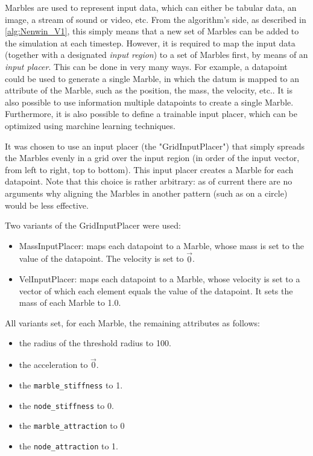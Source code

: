 Marbles are used to represent input data, which can either be tabular data, an image, a stream of sound or video, etc.
From the algorithm's side, as described in \ref{alg:Nenwin_V1}, 
this simply means that a new set of Marbles can be added to the simulation at each timestep.
However, it is required to map the input data (together with a designated \textit{input region}) to a set of Marbles first, by means of an \textit{input placer}.
This can be done in very many ways. For example, a datapoint could be used to generate a single Marble, in which the datum is mapped to an attribute of the Marble, such as the position, the mass, the velocity, etc.. It is also possible to use information multiple datapoints to create a single Marble. Furthermore, it is also possible to define a trainable input placer, which can be optimized using marchine learning techniques.

It was chosen to use an input placer (the "GridInputPlacer") that simply spreads the Marbles evenly in a grid over the input region (in order of the input vector, from left to right, top to bottom). This input placer creates a Marble for each datapoint.
Note that this choice is rather arbitrary: as of current there are no arguments why aligning the Marbles in another pattern (such as on a circle) would be less effective.

Two variants of the GridInputPlacer were used:
\begin{itemize}
	\item MassInputPlacer: maps each datapoint to a Marble, whose mass is set to the value of the datapoint. The velocity is set to $\vec{0}$.
	\item VelInputPlacer: maps each datapoint to a Marble, whose velocity is set to a vector of which each element equals the value of the datapoint. It sets the mass of each Marble to 1.0.
\end{itemize}

All variants set, for each Marble, the remaining attributes as follows:
\begin{itemize}
	\item the radius of the threshold radius to 100.
	\item the acceleration to $\vec{0}$.
	\item the \texttt{marble\_stiffness} to 1.
	\item the \texttt{node\_stiffness} to 0.
	\item the \texttt{marble\_attraction} to 0
	\item the \texttt{node\_attraction} to 1.
\end{itemize}

